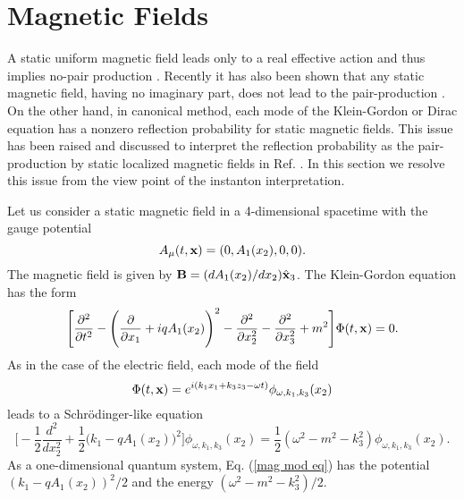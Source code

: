 \documentclass[a4paper,prd,showpacs,preprintnumbers,amsmath,amssymb]{revtex4}
\begin{document}
\section{Magnetic Fields}



A static uniform magnetic field leads only to a real effective
action and thus implies no-pair production \cite{sch}. Recently it
has also been shown that any static magnetic field, having no
imaginary part, does not lead to the pair-production
\cite{dun,sri,dun2}. On the other hand, in canonical method, each
mode of the Klein-Gordon or Dirac equation has a nonzero
reflection probability for static magnetic fields. This issue has
been raised and discussed to interpret the reflection probability
as the pair-production by static localized magnetic fields in Ref.
\cite{sri}. In this section we resolve this issue from the view
point of the instanton interpretation.





Let us consider a static magnetic field in a 4-dimensional
spacetime with the gauge potential
\begin{equation}
A_{\mu} (t, {\bf x}) = (0, A_1 (x_2), 0, 0).
\end{equation}
The magnetic field is given by ${\bf B} = (d A_1 (x_2)/dx_2)
\hat{\bf x}_3$. The Klein-Gordon equation has the form
\begin{equation}
\Biggl[ \frac{\partial^2}{\partial t^2} -
\Biggl(\frac{\partial}{\partial x_1} + i q A_1 (x_2) \Biggr)^2 -
\frac{\partial^2}{\partial x_2^2} - \frac{\partial^2}{\partial
x_3^2} + m^2 \Biggr] \Phi (t, {\bf x}) = 0. \label{kg eq4}
\end{equation}
As in the case of the electric field, each mode of the field
\begin{equation}
\Phi (t, {\bf x}) = e^{i (k_1 x_1 + k_3 z_3 - \omega
t)}\phi_{\omega, k_1, k_3} (x_2)
\end{equation}
leads to a Schr\"{o}dinger-like equation
\begin{equation}
\Biggl[- \frac{1}{2} \frac{d^2}{dx_2^2} + \frac{1}{2}\Biggl(k_1 -
q A_1 ( x_2)\Biggr)^2 \Biggr] \phi_{\omega, k_1, k_3} (x_2) =
\frac{1}{2}(\omega^2 - m^2 - k_3^2) \phi_{\omega, k_1, k_3} (x_2).
\label{mag mod eq}
\end{equation}
As a one-dimensional quantum system, Eq. (\ref{mag mod eq}) has
the potential $(k_1 - q A_1 ( x_2))^2/2$ and the energy $(\omega^2
- m^2 - k_3^2)/2$.
\end{document}
